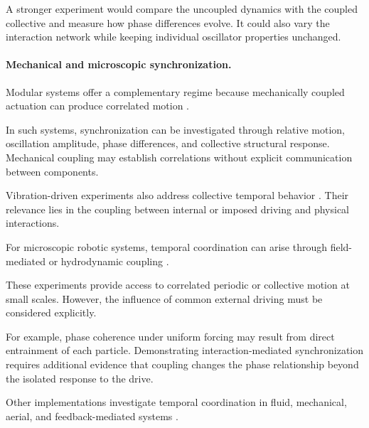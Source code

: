A stronger experiment
would compare the
uncoupled dynamics
with the coupled
collective and
measure how phase
differences evolve.
It could also vary
the interaction network
while keeping individual
oscillator properties
unchanged.

\paragraph*{Mechanical and microscopic synchronization.}

Modular systems offer
a complementary regime
because mechanically
coupled actuation can
produce correlated motion
\cite{Hu2026diatominspired1di,Ma2024smarticle20desig,Bhattacharjee2026collectiveassembly,Drew2021acousticcommunicati,Ding2025transformablemodula,Ceron2021softroboticoscilla,Wang2026oscillatingeelrobo}.

In such systems,
synchronization can
be investigated through
relative motion,
oscillation amplitude,
phase differences,
and collective
structural response.
Mechanical coupling
may establish correlations
without explicit
communication between
components.

Vibration-driven experiments
also address collective
temporal behavior
\cite{Escobar2025effectofparticlec,Rubenstein2014kilobotalowcost,Baconnier2022selectiveandcollec,Novkoski2026graspionanopenso,Xia2024biomimeticsynchroni}.
Their relevance lies
in the coupling between
internal or imposed
driving and physical
interactions.

For microscopic robotic
systems, temporal coordination
can arise through field-mediated
or hydrodynamic coupling
\cite{Xie2020bioinspiredsoftmic,Pauer2021programmabledesign,Je2024spatiallyselective,Chen2020temporallightmodul,Chen2022programmablespatio,Chen2023nanorobotmediateds,Yang2022emergentmicroroboti,Aubret2018targetedassemblyan,Liu2026magneticcompartment,Yu2019reconfigurablecollo,Zhang20233dprintedmicromete,Taghavi2024coordinatedbehavior}.

These experiments provide
access to correlated
periodic or collective
motion at small scales.
However, the influence
of common external
driving must be
considered explicitly.

For example, phase
coherence under
uniform forcing
may result from
direct entrainment
of each particle.
Demonstrating
interaction-mediated
synchronization requires
additional evidence
that coupling changes
the phase relationship
beyond the isolated
response to the drive.

Other implementations
investigate temporal
coordination in fluid,
mechanical, aerial,
and feedback-mediated
systems
\cite{Zhou2021synchronizedswimmin,Gravish2023coordinatedcollecti,Hu2026phototunablenonreci,Deng2022lightfuelednonreci,Vantomme2021coupledliquidcryst,Soria2021predictivecontrolo,Hao2022proprioceptivefeedb,Warmington2026adiscontinuouslyco,B2023adiscontinuouslyco,Zhou2021collectivesynchroni,Nilles2019ahardwareandsoftw,Yan2026flockingbehaviorfo,Berlinger2021implicitcoordinatio,Paley2021planarformationcon,Wei2020densitydependentsy,Leech2026spincoupledhydrody,Heuthe2025tunablecolloidalsw,Elshalakani2020simulationofselfc,Fruchart2021nonreciprocalphase}.

